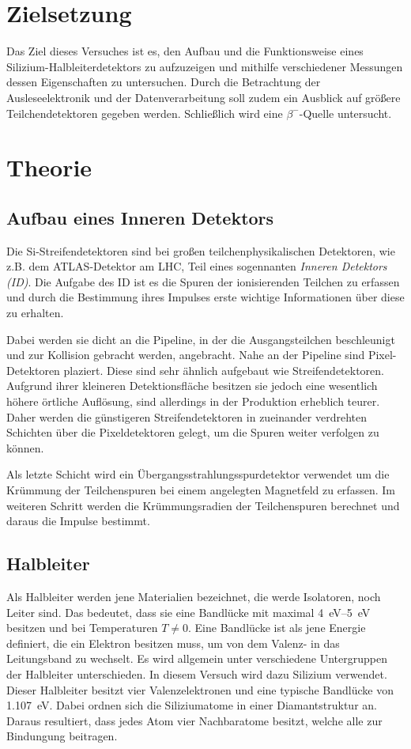 \section{Zielsetzung}
\label{sec:Zielsetzung}

Das Ziel dieses Versuches ist es, den Aufbau und die Funktionsweise eines
Silizium-Halbleiterdetektors zu aufzuzeigen und mithilfe verschiedener Messungen dessen
Eigenschaften zu untersuchen. Durch die Betrachtung der Ausleseelektronik und
der Datenverarbeitung soll zudem ein Ausblick auf größere Teilchendetektoren
gegeben werden. Schließlich wird eine $\beta^{-}$-Quelle untersucht.

\section{Theorie}
\label{sec:Theorie}
\subsection{Aufbau eines Inneren Detektors}

Die Si-Streifendetektoren sind bei großen teilchenphysikalischen Detektoren,
wie z.B. dem ATLAS-Detektor am LHC, Teil eines sogennanten \textit{Inneren Detektors (ID)}.
Die Aufgabe des ID ist es die Spuren der ionisierenden Teilchen zu erfassen und
durch die Bestimmung ihres Impulses erste wichtige Informationen über diese zu
erhalten.

Dabei werden sie dicht an die Pipeline, in der die Ausgangsteilchen beschleunigt und
zur Kollision gebracht werden, angebracht. Nahe an der Pipeline sind Pixel-Detektoren plaziert.
Diese sind sehr ähnlich aufgebaut wie Streifendetektoren. Aufgrund ihrer kleineren
Detektionsfläche besitzen sie jedoch eine wesentlich höhere örtliche Auflösung, sind
allerdings in der Produktion erheblich teurer. Daher werden die günstigeren
Streifendetektoren in zueinander verdrehten Schichten über die Pixeldetektoren
gelegt, um die Spuren weiter verfolgen zu können.

Als letzte Schicht wird ein Übergangsstrahlungsspurdetektor verwendet um die
Krümmung der Teilchenspuren bei einem angelegten Magnetfeld zu
erfassen. Im weiteren Schritt werden die Krümmungsradien der Teilchenspuren
berechnet und daraus die Impulse bestimmt.

\subsection{Halbleiter}
\label{sec:Halbleiter-Theorie}
Als Halbleiter werden jene Materialien bezeichnet, die werde Isolatoren, noch Leiter
sind. Das bedeutet, dass sie eine Bandlücke mit maximal \SIrange{4}{5}{\electronvolt}
besitzen und bei Temperaturen $T \neq 0$. Eine Bandlücke ist
als jene Energie definiert, die ein Elektron besitzen muss, um von dem Valenz-
in das Leitungsband zu wechselt. Es wird allgemein unter verschiedene
Untergruppen der Halbleiter unterschieden.
In diesem Versuch wird dazu Silizium verwendet. Dieser Halbleiter besitzt vier
Valenzelektronen und eine typische Bandlücke von \SI{1.107}{\electronvolt}.
 Dabei ordnen sich die Siliziumatome in einer Diamantstruktur an. Daraus
 resultiert, dass jedes Atom vier Nachbaratome besitzt, welche alle zur Bindungung
 beitragen.

